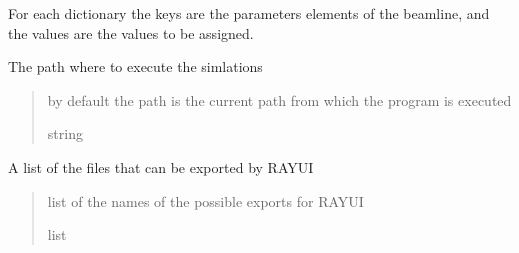 \documentclass[letterpaper,10pt,english]{sphinxmanual}
\begin{document}
\begin{fulllineitems}
\begin{fulllineitems}
\sphinxAtStartPar
For each dictionary the keys are the parameters elements of the beamline,
and the values are the values to be assigned.

\end{fulllineitems}


\begin{fulllineitems}
\label{\detokenize{API:raypyng.simulate.Simulate.path}}
\pysigstartsignatures
\pysigline
{}
\pysigstopsignatures
\sphinxAtStartPar
The path where to execute the simlations
\begin{quote}\begin{description}
\sphinxAtStartPar
by default the path is the current path from which
the program is executed

\sphinxAtStartPar
string

\end{description}\end{quote}

\end{fulllineitems}


\begin{fulllineitems}
\label{\detokenize{API:raypyng.simulate.Simulate.possible_exports}}
\pysigstartsignatures
\pysigline
{}
\pysigstopsignatures
\sphinxAtStartPar
A list of the files that can be exported by RAY\sphinxhyphen{}UI
\begin{quote}\begin{description}
\sphinxAtStartPar
list of the names of the possible exports for RAY\sphinxhyphen{}UI

\sphinxAtStartPar
list

\end{description}\end{quote}

\end{fulllineitems}



\end{fulllineitems}
\end{document}
